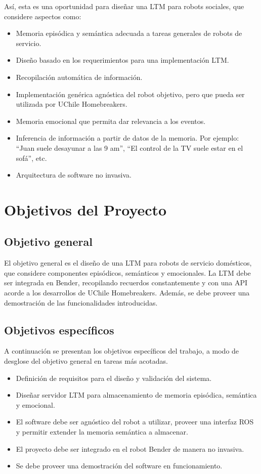Así, esta es una oportunidad para diseñar una LTM para robots sociales, que considere aspectos como: 
\begin{itemize}
	\item Memoria episódica y semántica adecuada a tareas generales de robots de servicio.
	\item Diseño basado en los requerimientos para una implementación LTM.
	\item Recopilación automática de información.
	\item Implementación genérica agnóstica del robot objetivo, pero que pueda ser utilizada por UChile Homebreakers.
	\item Memoria emocional que permita dar relevancia a los eventos.
	\item Inferencia de información a partir de datos de la memoria. Por ejemplo: ``Juan suele desayunar a las 9 am'', ``El control de la TV suele estar en el sofá'', etc.
	\item Arquitectura de software no invasiva.
\end{itemize}



\section{Objetivos del Proyecto}

\subsection{Objetivo general}

El objetivo general es el diseño de una LTM para robots de servicio domésticos, que considere componentes episódicos, semánticos y emocionales. La LTM debe ser integrada en Bender, recopilando recuerdos constantemente y con una API acorde a los desarrollos de UChile Homebreakers. Además, se debe proveer una demostración de las funcionalidades introducidas.


\subsection{Objetivos específicos}

A continuación se presentan los objetivos específicos del trabajo, a modo de desglose del objetivo general en tareas más acotadas.
\begin{itemize}
	\item Definición de requisitos para el diseño y validación del sistema.
	\item Diseñar servidor LTM para almacenamiento de memoria episódica, semántica y emocional.
	\item El software debe ser agnóstico del robot a utilizar, proveer una interfaz ROS y permitir extender la memoria semántica a almacenar.
	\item El proyecto debe ser integrado en el robot Bender de manera no invasiva.
	\item Se debe proveer una demostración del software en funcionamiento.
\end{itemize}


